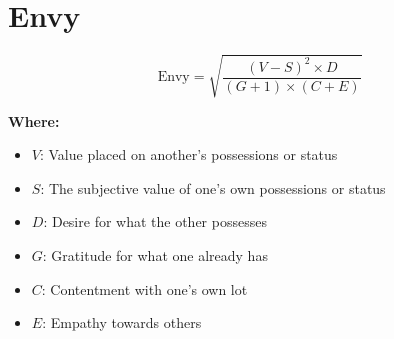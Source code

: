 \chapter{Envy}

\begin{equation}
\text{Envy} = \sqrt{\frac{(V - S)^2 \times D}{(G + 1) \times (C + E)}}
\end{equation}

\textbf{Where:}

\begin{itemize}
    \item $V$: Value placed on another's possessions or status
    \item $S$: The subjective value of one’s own possessions or status
    \item $D$: Desire for what the other possesses
    \item $G$: Gratitude for what one already has
    \item $C$: Contentment with one's own lot
    \item $E$: Empathy towards others
\end{itemize}